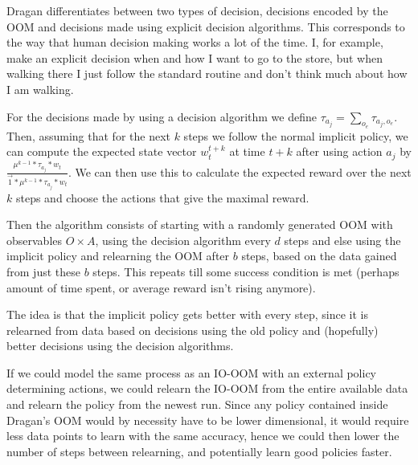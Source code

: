 \documentclass{article}
\theoremstyle{definition}
\begin{document}
Dragan differentiates between two types of decision, decisions encoded by the OOM and decisions made using explicit decision algorithms. This corresponds to the way that human decision making works a lot of the time. I, for example, make an explicit decision when and how I want to go to the store, but when walking there I just follow the standard routine and don't think much about how I am walking. 

For the decisions made by using a decision algorithm we define $\tau_{a_j}=\sum_{o_e} \tau_{a_j,o_e}$. Then, assuming that for the next $k$ steps we follow the normal implicit policy, we can compute the expected state vector $w_t^{t+k}$ at time $t+k$ after using action $a_j$ by $\frac{\mu^{k-1}*\tau_{a_j}*w_t}{\vec{1}*\mu^{k-1}*\tau_{a_j}*w_t}$. We can then use this to calculate the expected reward over the next $k$ steps and choose the actions that give the maximal reward. 
 
Then the algorithm consists of starting with a randomly generated OOM with observables $O\times A$, using the decision algorithm every $d$ steps and else using the implicit policy and relearning the OOM after $b$ steps, based on the data gained from just these $b$ steps. This repeats till some success condition is met (perhaps amount of time spent, or average reward isn't rising anymore). 

The idea is that the implicit policy gets better with every step, since it is relearned from data based on decisions using the old policy and (hopefully) better decisions using the decision algorithms. 

If we could model the same process as an IO-OOM with an external policy determining actions, we could relearn the IO-OOM from the entire available data and relearn the policy from the newest run. Since any policy contained inside Dragan's OOM would by necessity have to be lower dimensional, it would require less data points to learn with the same accuracy, hence we could then lower the number of steps between relearning, and potentially learn good policies faster. 
\end{document}
